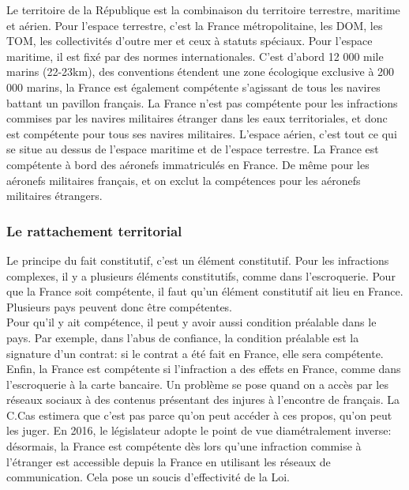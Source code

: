 \documentclass[10pt, a4paper, openany]{book}
\begin{document}
Le territoire de la République est la combinaison du territoire terrestre, maritime et aérien. Pour l'espace terrestre, c'est la France métropolitaine, les DOM, les TOM, les collectivités d'outre mer et ceux à statuts spéciaux. Pour l'espace maritime, il est fixé par des normes internationales. C'est d'abord 12 000 mile marins (22-23km), des conventions étendent une zone écologique exclusive à 200 000 marins, la France est également compétente s'agissant de tous les navires battant un pavillon français. La France n'est pas compétente pour les infractions commises par les navires militaires étranger dans les eaux territoriales, et donc est compétente pour tous ses navires militaires. L'espace aérien, c'est tout ce qui se situe au dessus de l'espace maritime et de l'espace terrestre. La France est compétente à bord des aéronefs immatriculés en France. De même pour les aéronefs militaires français, et on exclut la compétences pour les aéronefs militaires étrangers.

\subsubsection{Le rattachement territorial}

Le principe du fait constitutif, c'est un élément constitutif. Pour les infractions complexes, il y a plusieurs éléments constitutifs, comme dans l'escroquerie. Pour que la France soit compétente, il faut qu'un élément constitutif ait lieu en France. Plusieurs pays peuvent donc être compétentes. \\
Pour qu'il y ait compétence, il peut y avoir aussi condition préalable dans le pays. Par exemple, dans l'abus de confiance, la condition préalable est la signature d'un contrat: si le contrat a été fait en France, elle sera compétente. \\
Enfin, la France est compétente si l'infraction a des effets en France, comme dans l'escroquerie à la carte bancaire. Un problème se pose quand on a accès par les réseaux sociaux à des contenus présentant des injures à l'encontre de français. La C.Cas estimera que c'est pas parce qu'on peut accéder à ces propos, qu'on peut les juger. En 2016, le législateur adopte le point de vue diamétralement inverse: désormais, la France est compétente dès lors qu'une infraction commise à l'étranger est accessible depuis la France en utilisant les réseaux de communication. Cela pose un soucis d'effectivité de la Loi.
\end{document}
